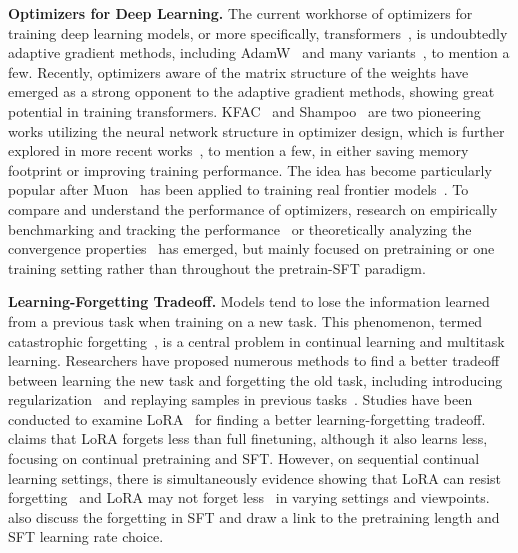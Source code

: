 \documentclass{article}
\theoremstyle{remark}
\begin{document}
\textbf{Optimizers for Deep Learning.} 
The current workhorse of optimizers for training deep learning models, or more specifically, transformers~\citep{vaswani2017attention}, is undoubtedly adaptive gradient methods, including AdamW~\citep{kingma2014adam,loshchilov2017decoupled} and many variants~\citep{duchi2011adaptive,streeter2010less,tieleman2012lecture,zeiler2012adadelta,shazeer2018adafactor,reddi2019convergence,you2019large,zhang2024adam,defazio2024road,yuan2024mars,defazio2025gradients,bernstein2018signsgd,crawshaw2022robustness,chen2023symbolic,yu2026stosignsgd}, to mention a few.
Recently, optimizers aware of the matrix structure of the weights have emerged as a strong opponent to the adaptive gradient methods, showing great potential in training transformers. KFAC~\citep{martens2015optimizing} and Shampoo~\citep{gupta2018shampoo} are two pioneering works utilizing the neural network structure in optimizer design, which is further explored in more recent works~\citep{ren2021tensor,zhao2024galore,jordan2024muon,vyas2024soap,liu2025muon,an2025asgo,xie2025structured,pan2025unbiased,xie2026controlled,wen2025hyperball}, to mention a few, in either saving memory footprint or improving training performance.
The idea has become particularly popular after Muon~\citep{jordan2024muon,liu2025muon} has been applied to training real frontier models~\citep{team2026kimi,zeng2025glm,deepseekai2026deepseekv4}. 
To compare and understand the performance of optimizers, research on empirically benchmarking and tracking the performance~\citep{wen2025fantastic,semenov2025benchmarking,wang2025muon} or theoretically analyzing the convergence properties~\citep{duchi2011adaptive,liu2024adagrad,jiang2024provable,su2025isotropic} has emerged, but mainly focused on pretraining or one training setting rather than throughout the pretrain-SFT paradigm.



\textbf{Learning-Forgetting Tradeoff.}
Models tend to lose the information learned from a previous task when training on a new task. This phenomenon, termed catastrophic forgetting~\citep{mccloskey1989catastrophic,mcclelland1995there,kirkpatrick2017overcoming}, is a central problem in continual learning and multitask learning. Researchers have proposed numerous methods to find a better tradeoff between learning the new task and forgetting the old task, including introducing regularization~\citep{kirkpatrick2017overcoming,zenke2017continual,li2017learning} and replaying samples in previous tasks~\citep{lopez2017gradient,rebuffi2017icarl,rolnick2019experience}.
Studies have been conducted to examine LoRA~\citep{hu2022lora} for finding a better learning-forgetting tradeoff. \citet{biderman2024lora} claims that LoRA forgets less than full finetuning, although it also learns less, focusing on continual pretraining and SFT. However, on sequential continual learning settings, there is simultaneously evidence showing that LoRA can resist forgetting~\citep{wistuba2023continual,qiao2024learn} and LoRA may not forget less~\citep{shuttleworth2024lora} in varying settings and viewpoints. \citet{springer2025overtrained,rofin2026learning} also discuss the forgetting in SFT and draw a link to the pretraining length and SFT learning rate choice.
\end{document}

